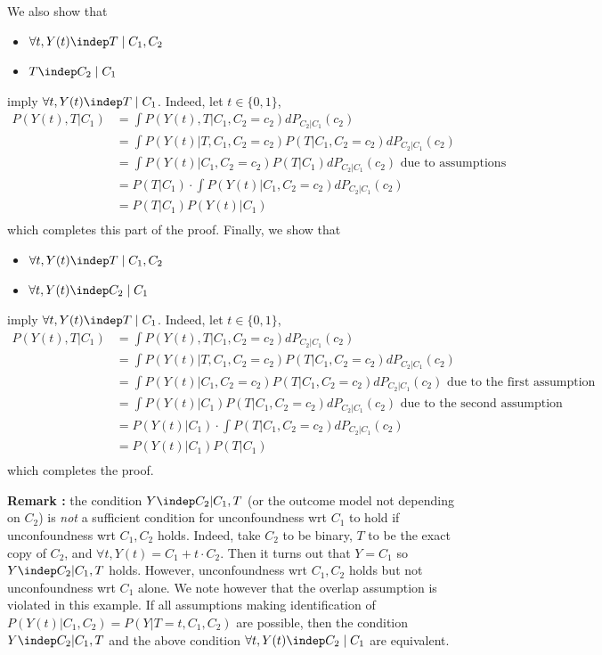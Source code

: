  
 
 \iffalse
 We also show that
 \begin{itemize}
     \item $\forall t, Y(t) \indep T \mid C_1, C_2$
     \item $T \indep C_2 \mid C_1$
 \end{itemize}
 imply $\forall t, Y(t) \indep T \mid C_1$. Indeed, let $t \in \{0,1\}$,
 \begin{align*}
     P(Y(t), T | C_1)
     &= \int P(Y(t), T | C_1, C_2 = c_2)dP_{C_2 | C_1}(c_2) \\
     &= \int P(Y(t) | T, C_1, C_2 = c_2)P(T | C_1, C_2 = c_2)dP_{C_2 | C_1}(c_2) \\
     &= \int P(Y(t) | C_1, C_2 = c_2)P(T | C_1)dP_{C_2 | C_1}(c_2) \text{ due to assumptions} \\ 
      &= P(T | C_1) \cdot \int P(Y(t) | C_1, C_2 = c_2)dP_{C_2 | C_1}(c_2)  \\ 
        &= P(T | C_1) P(Y(t) | C_1)  \\ 
 \end{align*}
 which completes this part of the proof. Finally, we show that
 \begin{itemize}
     \item $\forall t, Y(t) \indep T \mid C_1, C_2$
     \item $\forall t, Y(t) \indep C_2 \mid C_1$
 \end{itemize}
 imply $\forall t, Y(t) \indep T \mid C_1$. Indeed, let $t \in \{0,1\}$,
 \begin{align*}
     P(Y(t), T | C_1)
     &= \int P(Y(t), T | C_1, C_2 = c_2)dP_{C_2 | C_1}(c_2) \\
     &= \int P(Y(t) | T, C_1, C_2 = c_2)P(T | C_1, C_2 = c_2)dP_{C_2 | C_1}(c_2) \\
     &= \int P(Y(t) | C_1, C_2 = c_2)P(T | C_1, C_2 = c_2)dP_{C_2 | C_1}(c_2) \text{ due to the first assumption} \\ 
      &= \int P(Y(t) | C_1)P(T | C_1, C_2 = c_2)dP_{C_2 | C_1}(c_2) \text{ due to the second assumption} \\ 
      &= P(Y(t) | C_1) \cdot \int P(T | C_1, C_2 = c_2)dP_{C_2 | C_1}(c_2)  \\ 
        &= P(Y(t) | C_1)P(T | C_1)   \\ 
 \end{align*}
 which completes the proof.
 
 
\textbf{Remark :} the condition $Y \indep C_2 | C_1, T$ (or the outcome model not depending on $C_2$) is \emph{not} a sufficient condition for unconfoundness wrt $C_1$ to hold if unconfoundness wrt $C_1, C_2$ holds. Indeed, take $C_2$ to be binary, $T$ to be the exact copy of $C_2$, and $\forall t, Y(t) = C_1 + t \cdot C_2$. Then it turns out that $Y = C_1$ so $Y \indep C_2 | C_1, T$ holds. However, unconfoundness wrt $C_1, C_2$ holds but not unconfoundness wrt $C_1$ alone. We note however that the overlap assumption is violated in this example. If all assumptions making identification of $P(Y(t) | C_1, C_2) = P(Y | T=t, C_1, C_2)$ are possible, then the condition $Y \indep C_2 | C_1, T$ and the above condition $\forall t, Y(t) \indep C_2 \mid C_1$ are equivalent.

